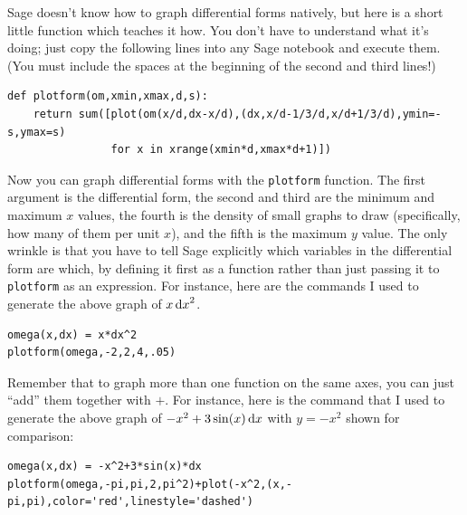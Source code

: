 \begin{sage}
  Sage doesn't know how to graph differential forms natively, but here is a short little function which teaches it how.
  You don't have to understand what it's doing; just copy the following lines into any Sage notebook and execute them.
  (You must include the spaces at the beginning of the second and third lines!)
\begin{verbatim}
def plotform(om,xmin,xmax,d,s):
    return sum([plot(om(x/d,dx-x/d),(dx,x/d-1/3/d,x/d+1/3/d),ymin=-s,ymax=s)
                for x in xrange(xmin*d,xmax*d+1)])
\end{verbatim}

  Now you can graph differential forms with the \texttt{plotform} function.
  The first argument is the differential form, the second and third are the minimum and maximum $x$ values, the fourth is the density of small graphs to draw (specifically, how many of them per unit $x$), and the fifth is the maximum $y$ value.
  The only wrinkle is that you have to tell Sage explicitly which variables in the differential form are which, by defining it first as a function rather than just passing it to \texttt{plotform} as an expression.
  For instance, here are the commands I used to generate the above graph of $x\,{\mathrm{d} x}^2$.
\begin{verbatim}
omega(x,dx) = x*dx^2
plotform(omega,-2,2,4,.05)
\end{verbatim}

  Remember that to graph more than one function on the same axes, you can just ``add'' them together with $+$.
  For instance, here is the command that I used to generate the above graph of $-x^2 + 3\sin(x)\,{\mathrm{d} x}$ with $y=-x^2$ shown for comparison:
\begin{verbatim}
omega(x,dx) = -x^2+3*sin(x)*dx
plotform(omega,-pi,pi,2,pi^2)+plot(-x^2,(x,-pi,pi),color='red',linestyle='dashed')
\end{verbatim}
\end{sage}


